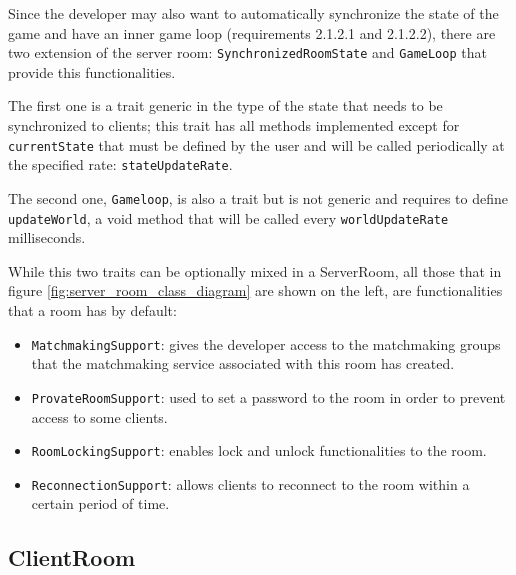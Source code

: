Since the developer may also want to automatically synchronize the state of the game and have an inner game loop (requirements 2.1.2.1 and 2.1.2.2), there are two extension of the server room: \texttt{SynchronizedRoomState} and \texttt{GameLoop} that provide this functionalities. 

The first one is a trait generic in the type of the state that needs to be synchronized to clients; this trait has all methods implemented except for \texttt{currentState} that must be defined by the user and will be called periodically at the specified rate: \texttt{stateUpdateRate}.

The second one, \texttt{Gameloop}, is also a trait but is not generic and requires to define \texttt{updateWorld}, a void method that will be called every \texttt{worldUpdateRate} milliseconds.

While this two traits can be optionally mixed in a ServerRoom, all those that in figure \ref{fig:server_room_class_diagram} are shown on the left, are functionalities that a room has by default:
\begin{itemize}
	\item \texttt{MatchmakingSupport}: gives the developer access to the matchmaking groups that the matchmaking service associated with this room has created.
	\item \texttt{ProvateRoomSupport}: used to set a password to the room in order to prevent access to some clients.
	\item \texttt{RoomLockingSupport}: enables lock and unlock functionalities to the room. 
	\item \texttt{ReconnectionSupport}: allows clients to reconnect to the room within a certain period of time.
\end{itemize}

\subsection{ClientRoom}

